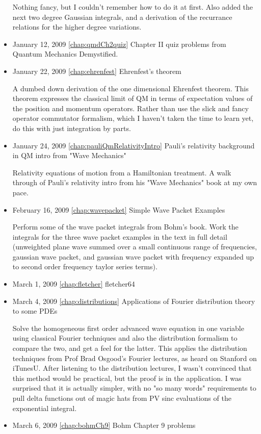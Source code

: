 \begin{itemize}
Nothing fancy, but I couldn't remember how to do it at first.  Also added the next two degree Gaussian integrals, and a derivation of the recurrance relations for the higher degree variations. \item January 12, 2009 \ref{chap:qmdCh2quiz} Chapter II quiz problems from Quantum Mechanics Demystified.

\item January 22, 2009 \ref{chap:ehrenfest} Ehrenfest's theorem

A dumbed down derivation of the one dimensional Ehrenfest theorem.  This theorem expresses the classical limit of QM in terms of expectation values of the position and momentum operators.  Rather than use the slick and fancy operator commutator formalism, which I haven't taken the time to learn yet, do this with just integration by parts. \item January 24, 2009 \ref{chap:pauliQmRelativityIntro} Pauli's relativity background in QM intro from "Wave Mechanics"

Relativity equations of motion from a Hamiltonian treatment.  A walk through of Pauli's relativity intro from his "Wave Mechanics" book at my own pace.\item February 16, 2009 \ref{chap:wavepacket} Simple Wave Packet Examples

Perform some of the wave packet integrals from Bohm's book.   Work the integrals for the three wave packet examples in the text in full detail (unweighted plane wave summed over a small continuous range of frequencies, gaussian wave packet, and gaussian wave packet with frequency expanded up to second order frequency taylor series terms).\item March 1, 2009 \ref{chap:fletcher} fletcher64

\item March 4, 2009 \ref{chap:distributions} Applications of Fourier distribution theory to some PDEs

Solve the homogeneous first order advanced wave equation in one variable using classical Fourier techniques and also the distribution formalism to compare the two, and get a feel for the latter.  This applies the distribution techniques from Prof Brad Osgood's Fourier lectures, as heard on Stanford on iTunesU.  After listening to the distribution lectures, I wasn't convinced that this method would be practical, but the proof is in the application.  I was surprised that it is actually simpler, with no "so many words" requirements to pull delta functions out of magic hats from PV sinc evaluations of the exponential integral. \item March 6, 2009 \ref{chap:bohmCh9} Bohm Chapter 9 problems


\end{itemize}
